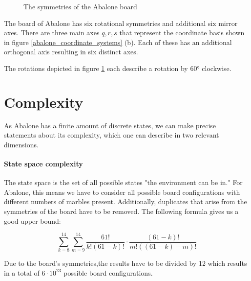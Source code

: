 \begin{figure}
    \centering
    \caption{The symmetries of the Abalone board}
    \label{abalone_symmetries_figure}
\end{figure}

The board of Abalone has six rotational symmetries and additional six mirror axes. There are three main axes $q, r, s$ that represent the coordinate basis shown in figure \ref{abalone_coordinate_systems} (b). Each of these has an additional orthogonal axis resulting in six distinct axes.

The rotations depicted in figure \ref{abalone_symmetries_figure} each describe a rotation by 60° clockwise.

\section{Complexity}
As Abalone has a finite amount of discrete states, we can make precise statements about its complexity, which one can describe in two relevant dimensions.

\paragraph{State space complexity}
\label{state_space_complexity}

The state space is the set of all possible states "the environment can be in." \cite[p. 150]{russell_artificial_2021} For Abalone, this means we have to consider all possible board configurations with different numbers of marbles present. Additionally, duplicates that arise from the symmetries of the board have to be removed. The following formula gives us a good upper bound:

\begin{equation}
    \sum_{k=8}^{14}\sum_{m=9}^{14}\frac{61!}{k!(61-k)!}\cdot\frac{(61-k)!}{m!((61-k)-m)!}
\end{equation}

Due to the board's symmetries,the results have to be divided by 12 which results in a total of $ 6 \cdot 10^{23} $ possible board configurations. \cite[p. 4]{lemmens_constructing_2005}


